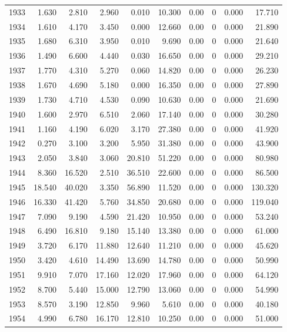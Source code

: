 \documentclass[
]{scrartcl}
\begin{document}
\begin{longtable}{rrrrrrrrrr}
1933 & 1.630 & 2.810 & 2.960 & 0.010 & 10.300 & 0.00 & 0 & 0.000 & 17.710 \\ 
1934 & 1.610 & 4.170 & 3.450 & 0.000 & 12.660 & 0.00 & 0 & 0.000 & 21.890 \\ 
1935 & 1.680 & 6.310 & 3.950 & 0.010 & 9.690 & 0.00 & 0 & 0.000 & 21.640 \\ 
1936 & 1.490 & 6.600 & 4.440 & 0.030 & 16.650 & 0.00 & 0 & 0.000 & 29.210 \\ 
1937 & 1.770 & 4.310 & 5.270 & 0.060 & 14.820 & 0.00 & 0 & 0.000 & 26.230 \\ 
1938 & 1.670 & 4.690 & 5.180 & 0.000 & 16.350 & 0.00 & 0 & 0.000 & 27.890 \\ 
1939 & 1.730 & 4.710 & 4.530 & 0.090 & 10.630 & 0.00 & 0 & 0.000 & 21.690 \\ 
1940 & 1.600 & 2.970 & 6.510 & 2.060 & 17.140 & 0.00 & 0 & 0.000 & 30.280 \\ 
1941 & 1.160 & 4.190 & 6.020 & 3.170 & 27.380 & 0.00 & 0 & 0.000 & 41.920 \\ 
1942 & 0.270 & 3.100 & 3.200 & 5.950 & 31.380 & 0.00 & 0 & 0.000 & 43.900 \\ 
1943 & 2.050 & 3.840 & 3.060 & 20.810 & 51.220 & 0.00 & 0 & 0.000 & 80.980 \\ 
1944 & 8.360 & 16.520 & 2.510 & 36.510 & 22.600 & 0.00 & 0 & 0.000 & 86.500 \\ 
1945 & 18.540 & 40.020 & 3.350 & 56.890 & 11.520 & 0.00 & 0 & 0.000 & 130.320 \\ 
1946 & 16.330 & 41.420 & 5.760 & 34.850 & 20.680 & 0.00 & 0 & 0.000 & 119.040 \\ 
1947 & 7.090 & 9.190 & 4.590 & 21.420 & 10.950 & 0.00 & 0 & 0.000 & 53.240 \\ 
1948 & 6.490 & 16.810 & 9.180 & 15.140 & 13.380 & 0.00 & 0 & 0.000 & 61.000 \\ 
1949 & 3.720 & 6.170 & 11.880 & 12.640 & 11.210 & 0.00 & 0 & 0.000 & 45.620 \\ 
1950 & 3.420 & 4.610 & 14.490 & 13.690 & 14.780 & 0.00 & 0 & 0.000 & 50.990 \\ 
1951 & 9.910 & 7.070 & 17.160 & 12.020 & 17.960 & 0.00 & 0 & 0.000 & 64.120 \\ 
1952 & 8.700 & 5.440 & 15.000 & 12.790 & 13.060 & 0.00 & 0 & 0.000 & 54.990 \\ 
1953 & 8.570 & 3.190 & 12.850 & 9.960 & 5.610 & 0.00 & 0 & 0.000 & 40.180 \\ 
1954 & 4.990 & 6.780 & 16.170 & 12.810 & 10.250 & 0.00 & 0 & 0.000 & 51.000 \\ 

\end{longtable}
\end{document}
